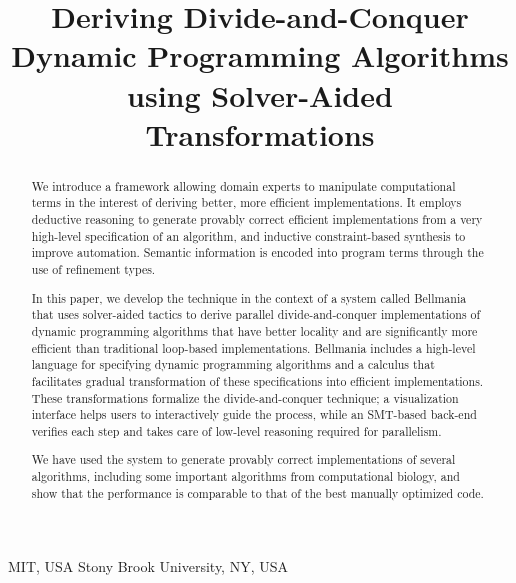 \documentclass[10pt,numbers]{sigplanconf}
\begin{document}




\title{Deriving Divide-and-Conquer Dynamic Programming Algorithms using 
  Solver-Aided Transformations}

           {MIT, USA}
           {\vspace{-2em}}
           {Stony Brook University, NY, USA}
           {}

\toappear{}

\maketitle

\begin{abstract}
We introduce a framework allowing domain experts
to manipulate computational terms
in the interest of deriving better, more efficient implementations.
It employs deductive reasoning to generate provably correct efficient implementations from a very high-level specification of an algorithm,
and inductive constraint-based synthesis to improve automation.
Semantic information is encoded into program terms through the use of refinement types.

In this paper, we develop the technique in the context of a system called Bellmania that uses solver-aided tactics to derive parallel divide-and-conquer implementations of dynamic programming algorithms that have better locality and are significantly more efficient than traditional loop-based implementations. Bellmania includes a high-level language for specifying dynamic programming algorithms and a calculus that facilitates gradual transformation of these specifications into efficient implementations.
These transformations formalize the divide-and-conquer technique; a visualization interface helps users to interactively guide the process,
while an SMT-based back-end verifies each step
and takes care of low-level reasoning required for parallelism.

We have used the system to generate provably correct implementations of several algorithms, including some important algorithms from computational biology, and show that the performance is comparable to that of the best manually optimized code.
\end{abstract}
\end{document}
